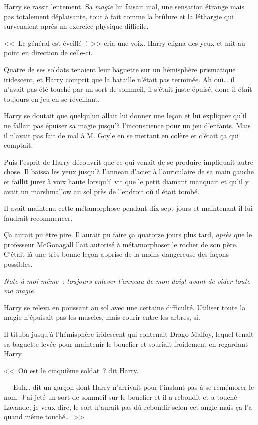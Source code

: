 Harry se rassit lentement. Sa \emph{magie} lui faisait mal, une sensation étrange mais pas totalement déplaisante, tout à fait comme la brûlure et la léthargie qui survenaient après un exercice physique difficile.

<<~Le général est éveillé~!~>> cria une voix. Harry cligna des yeux et mit au point en direction de celle-ci.

Quatre de ses soldats tenaient leur baguette sur un hémisphère prismatique iridescent, et Harry comprit que la bataille n'était pas terminée. Ah oui… il n'avait pas été touché par un sort de sommeil, il s'était juste épuisé, donc il était toujours en jeu en se réveillant.

Harry se doutait que quelqu'un allait lui donner une leçon et lui expliquer qu'il ne fallait pas épuiser sa magie jusqu'à l'inconscience pour un jeu d'enfants. Mais il n'avait pas fait de mal à M. Goyle en se mettant en colère et c'était ça qui comptait.

Puis l'esprit de Harry découvrit que ce qui venait de se produire impliquait autre chose. Il baissa les yeux jusqu'à l'anneau d'acier à l'auriculaire de sa main gauche et faillit jurer à voix haute lorsqu'il vit que le petit diamant manquait et qu'il y avait un marshmallow au sol près de l'endroit où il était tombé.

Il avait maintenu cette métamorphose pendant dix-sept jours et maintenant il lui faudrait recommencer.

Ça aurait pu être pire. Il aurait pu faire ça quatorze jours plus tard, \emph{après} que le professeur McGonagall l'ait autorisé à métamorphoser le rocher de son père. C'était là une très bonne leçon apprise de la moins dangereuse des façons possibles.

\emph{Note à moi-même~: toujours enlever l'anneau de mon doigt avant de vider toute ma magie.}

Harry se releva en poussant au sol avec une certaine difficulté. Utiliser toute la magie n'épuisait pas les muscles, mais courir entre les arbres, si.

Il tituba jusqu'à l'hémisphère iridescent qui contenait Drago Malfoy, lequel tenait sa baguette levée pour maintenir le bouclier et souriait froidement en regardant Harry.

<<~Où est le cinquième soldat~? dit Harry.

--- Euh… dit un garçon dont Harry n'arrivait pour l'instant pas à se remémorer le nom. J'ai jeté un sort de sommeil sur le bouclier et il a rebondit et a touché Lavande, je veux dire, le sort n'aurait pas dû rebondir selon cet angle mais ça l'a quand même touché…~>>

